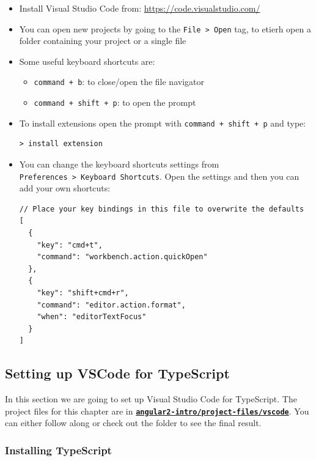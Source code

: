 \documentclass[12pt,]{article}
\providecommand{\tightlist}{%
  \setlength{\itemsep}{0pt}\setlength{\parskip}{0pt}}
\begin{document}
\begin{itemize}
\item
  Install Visual Studio Code from: \url{https://code.visualstudio.com/}
\item
  You can open new projects by going to the
  \texttt{File\ \textgreater{}\ Open} tag, to etierh open a folder
  containing your project or a single file
\item
  Some useful keyboard shortcuts are:

  \begin{itemize}
  \tightlist
  \item
    \texttt{command\ +\ b}: to close/open the file navigator
  \item
    \texttt{command\ +\ shift\ +\ p}: to open the prompt
  \end{itemize}
\item
  To install extensions open the prompt with
  \texttt{command\ +\ shift\ +\ p} and type:

\begin{verbatim}
> install extension
\end{verbatim}
\item
  You can change the keyboard shortcuts settings from
  \texttt{Preferences\ \textgreater{}\ Keyboard\ Shortcuts}. Open the
  settings and then you can add your own shortcuts:

\begin{verbatim}
// Place your key bindings in this file to overwrite the defaults
[
  {
    "key": "cmd+t",
    "command": "workbench.action.quickOpen"
  },
  {
    "key": "shift+cmd+r",
    "command": "editor.action.format",
    "when": "editorTextFocus"
  }
]
\end{verbatim}
\end{itemize}

\subsection{Setting up VSCode for
TypeScript}\label{setting-up-vscode-for-typescript}

In this section we are going to set up Visual Studio Code for
TypeScript. The project files for this chapter are in
\href{https://github.com/st32lth/angular2-intro/tree/master/project-files/vscode}{\textbf{\texttt{angular2-intro/project-files/vscode}}}.
You can either follow along or check out the folder to see the final
result.

\subsubsection{Installing TypeScript}\label{installing-typescript}
\end{document}
